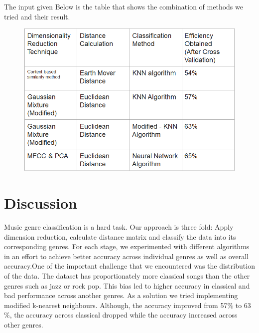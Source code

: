 \documentclass[12pt]{article}
\begin{document}
The input given Below is the table that shows the combination of methods we tried and their result.
\begin{figure}[H]
\includegraphics [scale=0.7]{table.png}
\end{figure}
\section{Discussion}\label{sec:disc}
Music genre classification is a hard task. Our approach is three fold: Apply dimension reduction, calculate distance matrix and classify the data into its corresponding genres. For each stage, we experimented with different algorithms in an effort to achieve better accuracy across individual genres as well as overall accuracy.One of the important challenge that we encountered was the distribution of the data. The dataset has proportionately more classical songs than the other genres such as jazz or rock pop. This bias led to higher accuracy in classical and bad performance across another genres. As a solution we tried implementing modified k-nearest neighbours. Although, the accuracy improved from 57$\%$ to 63$\%$, the accuracy across classical dropped while the accuracy increased across other genres.
\end{document}
